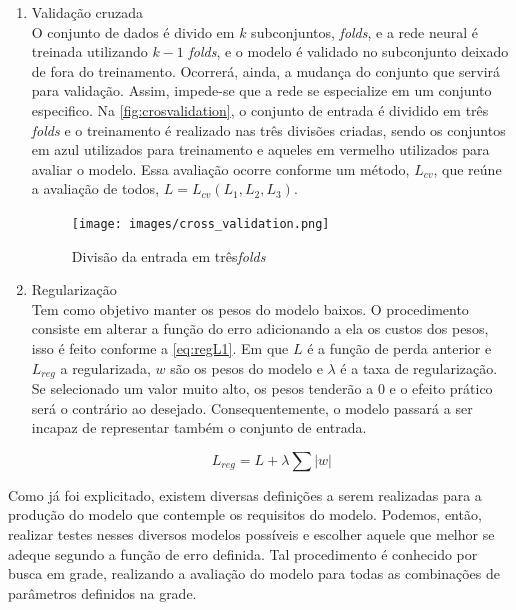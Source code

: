 \documentclass[
    12pt,
    oneside,
    a4paper,
    english,
    brazil
]{abntex2}
\begin{document}
\begin{enumerate}
    \item Validação cruzada\\
        O conjunto de  dados é divido em $k$ subconjuntos,  \textit{folds}, e a
        rede neural  é treinada utilizando  $k-1$ \textit{folds}, e o  modelo é
        validado  no  subconjunto deixado  de  fora  do treinamento.  Ocorrerá,
        ainda,  a  mudança  do  conjunto que  servirá  para  validação.  Assim,
        impede-se  que a  rede se  especialize  em um  conjunto especifico.  Na
        \autoref{fig:crosvalidation}, o conjunto de  entrada é dividido em três
        \textit{folds} e o  treinamento é realizado nas  três divisões criadas,
        sendo os  conjuntos em  azul utilizados para  treinamento e  aqueles em
        vermelho  utilizados  para  avaliar  o modelo.  Essa  avaliação  ocorre
        conforme um  método, $L_{cv}$,  que reúne  a avaliação  de todos,  $L =
        L_{cv}(L_1, L_2, L_3)$.

        \begin{figure}[ht]
            \centering
            \caption{Divisão da entrada em três\textit{folds}}\label{fig:crosvalidation}
            \texttt{[image: images/cross\_validation.png]}
        \end{figure}

    \item Regularização\\
        Tem  como objetivo  manter os  pesos do  modelo baixos.  O procedimento
        consiste em  alterar a função do  erro adicionando a ela  os custos dos
        pesos,  isso é  feito conforme  a \autoref{eq:regL1}.  Em que  $L$ é  a
        função de perda  anterior e $L_{reg}$ a regularizada, $w$  são os pesos
        do modelo  e $\lambda$  é a  taxa de  regularização. Se  selecionado um
        valor muito  alto, os pesos  tenderão a $0$ e  o efeito prático  será o
        contrário ao desejado. Consequentemente, o modelo passará a ser incapaz
        de representar também o conjunto de entrada.

        \begin{equation}\label{eq:regL1}
            L_{reg} = L + \lambda \sum{|w|}
        \end{equation}
\end{enumerate}

Como já foi explicitado, existem diversas  definições a serem realizadas para a
produção  do modelo  que contemple  os  requisitos do  modelo. Podemos,  então,
realizar testes nesses diversos modelos  possíveis e escolher aquele que melhor
se adeque segundo  a função de erro definida. Tal  procedimento é conhecido por
busca em grade,  realizando a avaliação do modelo para  todas as combinações de
parâmetros definidos na grade.
\end{document}
